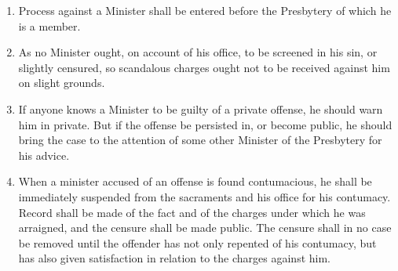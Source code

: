 \documentclass[
]{book}
\begin{document}
\protect\hypertarget{chapter-slug-37-special-rules-pertaining-to-process-against-a-minister}{\href{}{}}

\begin{enumerate}
\def\labelenumi{\arabic{enumi}.}
\item
  \protect\hypertarget{37}{\href{}{}}Process against a Minister shall be entered before the Presbytery of which he is a member.
\item
  As no Minister ought, on account of his office, to be screened in his sin, or slightly censured, so scandalous charges ought not to be received against him on slight grounds.
\item
  If anyone knows a Minister to be guilty of a private offense, he should warn him in private. But if the offense be persisted in, or become public, he should bring the case to the attention of some other Minister of the Presbytery for his advice.
\item
  \protect\hypertarget{37.4}{\href{}{}}When a minister accused of an offense is found contumacious, he shall be immediately suspended from the sacraments and his office for his contumacy. Record shall be made of the fact and of the charges under which he was arraigned, and the censure shall be made public. The censure shall in no case be removed until the offender has not only repented of his contumacy, but has also given satisfaction in relation to the charges against him.


\end{enumerate}
\end{document}
